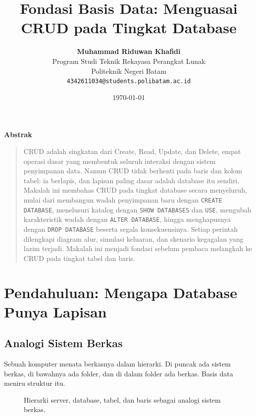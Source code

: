 \documentclass[11pt,a4paper]{article}
\title{\vspace{-1.5cm}\textbf{\sffamily\LARGE Fondasi Basis Data: Menguasai CRUD pada Tingkat Database}}
\author{
	\textbf{Muhammad Riduwan Khafidi} \\
	\small Program Studi Teknik Rekayasa Perangkat Lunak \\
	\small Politeknik Negeri Batam \\
	\small \texttt{4342611034@students.polibatam.ac.id}
}
\date{\small\today}
\renewenvironment{abstract}
{\small
	\begin{center}\textbf{\sffamily Abstrak}\end{center}
	\begin{quote}}
	{\end{quote}}
\begin{document}
\maketitle
\thispagestyle{empty}

\begin{abstract}
	CRUD adalah singkatan dari Create, Read, Update, dan Delete, empat operasi dasar yang membentuk seluruh interaksi dengan sistem penyimpanan data. Namun CRUD tidak berhenti pada baris dan kolom tabel: ia berlapis, dan lapisan paling dasar adalah database itu sendiri. Makalah ini membahas CRUD pada tingkat database secara menyeluruh, mulai dari membangun wadah penyimpanan baru dengan \texttt{CREATE DATABASE}, menelusuri katalog dengan \texttt{SHOW DATABASES} dan \texttt{USE}, mengubah karakteristik wadah dengan \texttt{ALTER DATABASE}, hingga menghapusnya dengan \texttt{DROP DATABASE} beserta segala konsekuensinya. Setiap perintah dilengkapi diagram alur, simulasi keluaran, dan skenario kegagalan yang lazim terjadi. Makalah ini menjadi fondasi sebelum pembaca melangkah ke CRUD pada tingkat tabel dan baris.
\end{abstract}

\section{Pendahuluan: Mengapa Database Punya Lapisan}

\subsection{Analogi Sistem Berkas}

Sebuah komputer menata berkasnya dalam hierarki. Di puncak ada sistem berkas, di bawahnya ada folder, dan di dalam folder ada berkas. Basis data meniru struktur itu.

\begin{figure}[H]
	\centering
	\caption{Hierarki server, database, tabel, dan baris sebagai analogi sistem berkas.}
	\label{fig:hierarchy}
\end{figure}
\end{document}
